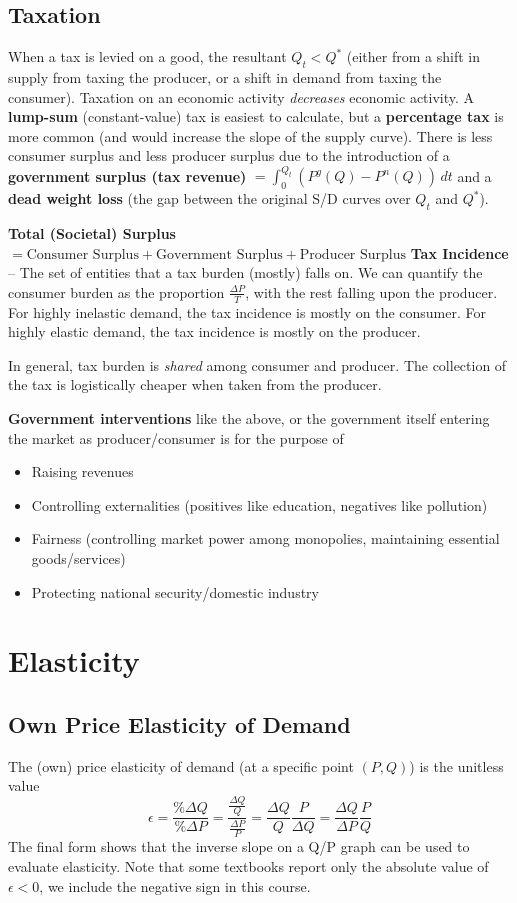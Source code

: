 \documentclass{article}
\def\term #1{\termb{#1} --}
\def\termb #1{\1 \textbf{#1}}
\begin{document}
\subsection{Taxation}
When a tax is levied on a good, the resultant $Q_t<Q^*$ (either from a shift in supply from taxing the producer, or a shift in demand from taxing the consumer). Taxation on an economic activity \textit{decreases} economic activity. A \textbf{lump-sum} (constant-value) tax is easiest to calculate, but a \textbf{percentage tax} is more common (and would increase the slope of the supply curve). There is less consumer surplus and less producer surplus due to the introduction of a \textbf{government surplus (tax revenue)} $=\int_0^{Q_t}\left(P^{g}(Q)-P^{n}(Q)\right)\,dt$ and a \textbf{dead weight loss} (the gap between the original S/D curves over $Q_t$ and $Q^*$).
\begin{outline}
    \termb{Total (Societal) Surplus} $=\textrm{Consumer Surplus} + \textrm{Government Surplus} + \textrm{Producer Surplus}$
    \term{Tax Incidence} The set of entities that a tax burden (mostly) falls on.
    \2 We can quantify the consumer burden as the proportion $\frac{\Delta P}{T}$, with the rest falling upon the producer.
    \2 For highly inelastic demand, the tax incidence is mostly on the consumer. For highly elastic demand, the tax incidence is mostly on the producer.
\end{outline}
In general, tax burden is \textit{shared} among consumer and producer. The collection of the tax is logistically cheaper when taken from the producer.

\textbf{Government interventions} like the above, or the government itself entering the market as producer/consumer is for the purpose of
\begin{itemize}
    \item Raising revenues
    \item Controlling externalities (positives like education, negatives like pollution)
    \item Fairness (controlling market power among monopolies, maintaining essential goods/services)
    \item Protecting national security/domestic industry
\end{itemize}

\section{Elasticity}
\subsection{Own Price Elasticity of Demand}
The (own) price elasticity of demand (at a specific point $(P,Q)$) is the unitless value
$$\epsilon = \frac{\%\Delta Q}{\%\Delta P} = \frac{\frac{\Delta Q}{Q}}{\frac{\Delta P}{P}} = \frac{\Delta Q}{Q}\frac{P}{\Delta Q} = \frac{\Delta Q}{\Delta P} \frac{P}{Q}$$
The final form shows that the inverse slope on a Q/P graph can be used to evaluate elasticity. Note that some textbooks report only the absolute value of $\epsilon<0$, we include the negative sign in this course.
\end{document}
